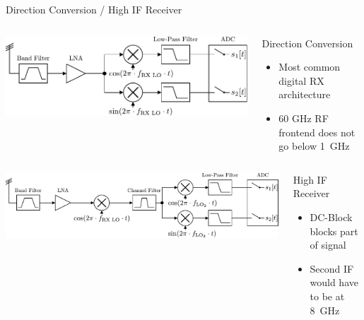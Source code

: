 \documentclass[10pt]{beamer}
\begin{document}
\begin{frame}{Direction Conversion / High IF Receiver}
  \begin{columns}[T]
    \begin{column}{.6\textwidth}
      \includegraphics[width=\textwidth]{figures/rx_4_bd}
    \end{column}
    \begin{column}{.4\textwidth}
      \begin{block}{Direction Conversion}
        \begin{itemize}
        \item Most common digital RX architecture
        \item 60 GHz RF frontend does not go below 1~GHz
        \end{itemize}
      \end{block}
    \end{column}
  \end{columns}
  \vspace{4ex}
  \begin{columns}[T]
    \begin{column}{.6\textwidth}
      \includegraphics[width=\textwidth]{figures/rx_0_bd}
    \end{column}
    \begin{column}{.4\textwidth}
      \begin{block}{High IF Receiver}
        \begin{itemize}
        \item DC-Block blocks part of signal
        \item Second IF would have to be at 8~GHz
        \end{itemize}
      \end{block}
    \end{column}
  \end{columns}
\end{frame}
\end{document}
